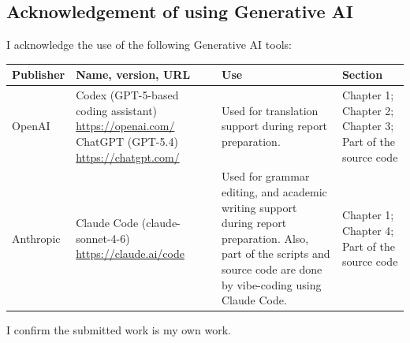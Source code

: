 \subsection*{Acknowledgement of using Generative AI}
{}
I acknowledge the use of the following Generative AI tools:
\begin{table}[H]
    \renewcommand{\arraystretch}{1.3}
    \small
    \setlength{\tabcolsep}{0.1cm}
    \begin{tabular}{|p{2.0cm}|p{3.8cm}|p{5.6cm}|p{3.5cm}|}
        \hline
        \textbf{Publisher} & \textbf{Name, version, URL} & \centering \textbf{Use} & \textbf{Section} \\
        \hline
        OpenAI & Codex (GPT-5-based coding assistant) \newline \url{https://openai.com/} 
        \newline ChatGPT (GPT-5.4) \newline
        \url{https://chatgpt.com/} & Used for translation support during report preparation. & Chapter 1; Chapter 2; Chapter 3; Part of the source code \\
        \hline
        Anthropic & Claude Code (claude-sonnet-4-6) \newline \url{https://claude.ai/code} & Used for grammar editing, and academic writing support during report preparation. Also, part of the scripts and source code are done by vibe-coding using Claude Code. & Chapter 1; Chapter 4; Part of the source code \\
        \hline
    \end{tabular}
\end{table}

I confirm the submitted work is my own work.